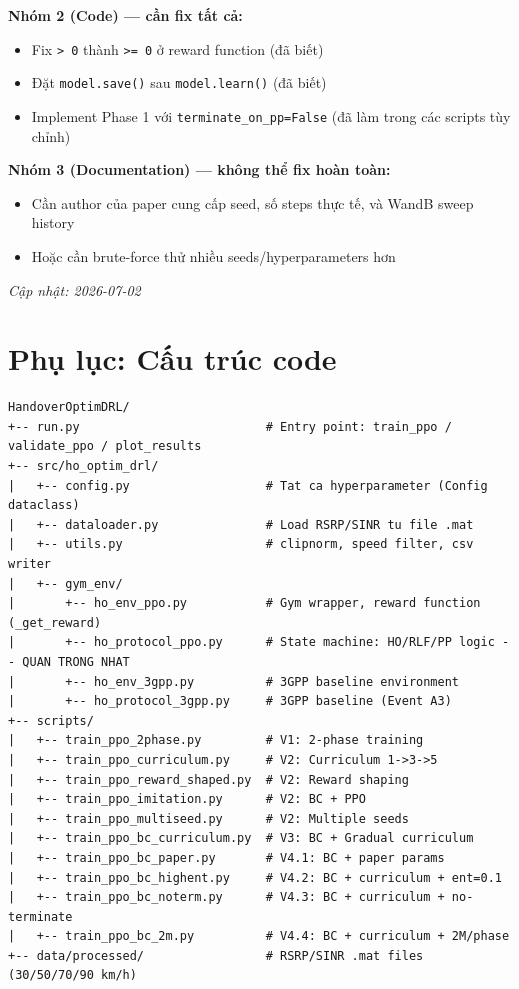 \documentclass[11pt]{article}
\begin{document}
\textbf{Nhóm 2 (Code) --- cần fix tất cả:}
\begin{itemize}
  \item[$\blacksquare$] Fix \texttt{> 0} thành \texttt{>= 0} ở reward function (đã biết)
  \item[$\blacksquare$] Đặt \texttt{model.save()} sau \texttt{model.learn()} (đã biết)
  \item[$\blacksquare$] Implement Phase 1 với \texttt{terminate\_on\_pp=False} (đã làm trong các scripts tùy chỉnh)
\end{itemize}

\textbf{Nhóm 3 (Documentation) --- không thể fix hoàn toàn:}
\begin{itemize}
  \item[$\square$] Cần author của paper cung cấp seed, số steps thực tế, và WandB sweep history
  \item[$\square$] Hoặc cần brute-force thử nhiều seeds/hyperparameters hơn
\end{itemize}

\bigskip
\textit{Cập nhật: 2026-07-02}

\appendix
\section*{Phụ lục: Cấu trúc code}

\begin{lstlisting}
HandoverOptimDRL/
+-- run.py                          # Entry point: train_ppo / validate_ppo / plot_results
+-- src/ho_optim_drl/
|   +-- config.py                   # Tat ca hyperparameter (Config dataclass)
|   +-- dataloader.py               # Load RSRP/SINR tu file .mat
|   +-- utils.py                    # clipnorm, speed filter, csv writer
|   +-- gym_env/
|       +-- ho_env_ppo.py           # Gym wrapper, reward function (_get_reward)
|       +-- ho_protocol_ppo.py      # State machine: HO/RLF/PP logic -- QUAN TRONG NHAT
|       +-- ho_env_3gpp.py          # 3GPP baseline environment
|       +-- ho_protocol_3gpp.py     # 3GPP baseline (Event A3)
+-- scripts/
|   +-- train_ppo_2phase.py         # V1: 2-phase training
|   +-- train_ppo_curriculum.py     # V2: Curriculum 1->3->5
|   +-- train_ppo_reward_shaped.py  # V2: Reward shaping
|   +-- train_ppo_imitation.py      # V2: BC + PPO
|   +-- train_ppo_multiseed.py      # V2: Multiple seeds
|   +-- train_ppo_bc_curriculum.py  # V3: BC + Gradual curriculum
|   +-- train_ppo_bc_paper.py       # V4.1: BC + paper params
|   +-- train_ppo_bc_highent.py     # V4.2: BC + curriculum + ent=0.1
|   +-- train_ppo_bc_noterm.py      # V4.3: BC + curriculum + no-terminate
|   +-- train_ppo_bc_2m.py          # V4.4: BC + curriculum + 2M/phase
+-- data/processed/                 # RSRP/SINR .mat files (30/50/70/90 km/h)
\end{lstlisting}
\end{document}
